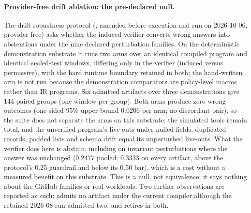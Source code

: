 \paragraph{Provider-free drift ablation: the pre-declared null.}
The drift-robustness protocol
(; amended before
execution and run on 2026-10-06, provider-free) asks whether the induced verifier
converts wrong answers into abstentions under the nine declared perturbation
families. On the deterministic demonstration substrate it runs two arms over an
identical compiled program and identical sealed-test windows, differing only in
the verifier (induced versus permissive), with the hard runtime boundary retained
in both; the hand-written arm is not run because the demonstration comparators
are policy-level macros rather than IR programs. Six admitted artifacts over
three demonstrations give 144 paired groups (one window per group). Both arms
produce zero wrong outcomes (one-sided 95\% upper bound 0.0206 per arm; no
discordant pair), so the suite does not separate the arms on this substrate:
the simulated tools remain total, and the unverified program's live-outs under
nulled fields, duplicated records, padded lists and schema drift equal its
unperturbed live-outs. What the verifier does here is abstain, including on
invariant perturbations where the answer was unchanged (0.2477 pooled; 0.3333 on
every  artifact, above the protocol's 0.25 guardrail and
below its 0.50 bar), which is a cost without a measured benefit on this
substrate. This is a null, not equivalence; it says nothing about the GitHub
families or real workloads. Two further observations are reported as such:
 admits no artifact under the current compiler although
the retained 2026-08 run admitted two, and  retires in both.

